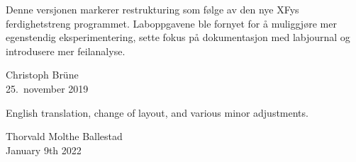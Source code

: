 \documentclass[../Elmag-labhefte-2021.tex]{subfiles}
\begin{document}












\bigskip

Denne versjonen markerer restrukturing som følge av den nye XFys ferdighetstreng programmet. Laboppgavene ble fornyet for å muliggjøre mer egenstendig eksperimentering, sette fokus på dokumentasjon med labjournal og introdusere mer feilanalyse. 

\bigskip
\begin{flushright}
  Christoph Br\"une\\
  25.\ november 2019
\end{flushright}


English translation, change of layout, and various minor adjustments.

\bigskip
\begin{flushright}
  Thorvald Molthe Ballestad\\
  January 9th 2022
\end{flushright}
\end{document}
